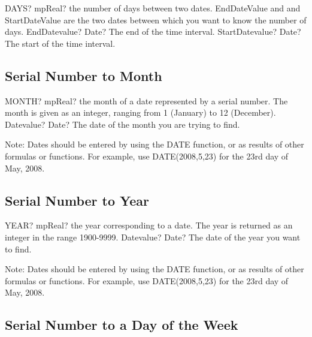 \begin{mpFunctionsExtract}
	\mpWorksheetFunctionTwoNotImplemented
	{DAYS? mpReal? the number of days between two dates. EndDateValue and  and StartDateValue  are the two dates between which you want to know the number of days.}
	{EndDatevalue? Date? The end of the time interval.}
	{StartDatevalue? Date? The start of the time interval.}
\end{mpFunctionsExtract}




\subsection{Serial Number to Month}

\begin{mpFunctionsExtract}
	\mpWorksheetFunctionOneNotImplemented
	{MONTH? mpReal? the month of a date represented by a serial number. The month is given as an integer, ranging from 1 (January) to 12 (December).}
	{Datevalue? Date? The date of the month you are trying to find.}
\end{mpFunctionsExtract}

\vspace{0.3cm}
Note: Dates should be entered by using the DATE function, or as results of other formulas or functions. For example, use DATE(2008,5,23) for the 23rd day of May, 2008.



\subsection{Serial Number to Year}

\begin{mpFunctionsExtract}
	\mpWorksheetFunctionOneNotImplemented
	{YEAR? mpReal? the year corresponding to a date. The year is returned as an integer in the range 1900-9999.}
	{Datevalue? Date? The date of the year you want to find.}
\end{mpFunctionsExtract}

\vspace{0.3cm}
Note: Dates should be entered by using the DATE function, or as results of other formulas or functions. For example, use DATE(2008,5,23) for the 23rd day of May, 2008.




\subsection{Serial Number to a Day of the Week}

